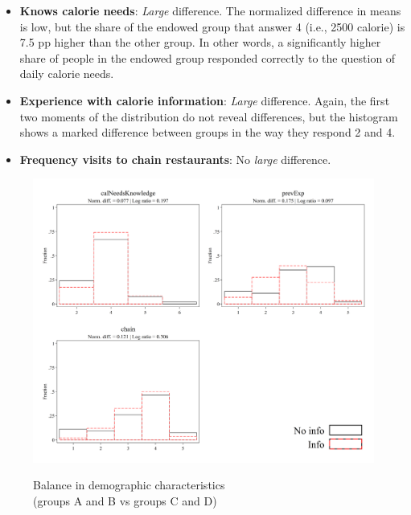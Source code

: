 \documentclass[12pt]{article}
\begin{document}
\begin{itemize}
  \item \textbf{Knows calorie needs}: \emph{Large} difference.
  The normalized difference in means is low, but the share of the endowed group that answer 4 (i.e., 2500 calorie) is 7.5 pp higher than the other group. In other words, a significantly higher share of people in the endowed group responded correctly to the question of daily calorie needs.

  \item \textbf{Experience with calorie information}: \emph{Large} difference.
  Again, the first two moments of the distribution do not reveal differences, but the histogram shows a marked difference between groups in the way they respond 2 and 4.

  \item \textbf{Frequency visits to chain restaurants}: No \emph{large} difference.
\end{itemize}

\begin{figure}[ht]
  \caption{Balance in demographic characteristics \\ (groups A and B vs groups C and D)}\label{fig:group2_calorie}
  \begin{center}
  {\includegraphics[width=1\textwidth]{./figures/covDifTreat_0_calorieKnow.png}}
  \end{center}
\end{figure}

\FloatBarrier
\end{document}
